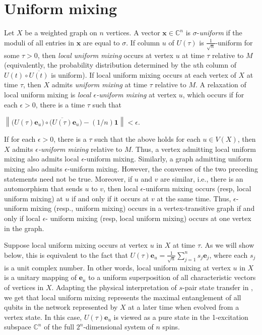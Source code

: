 \documentclass[11pt]{article}
\newcommand{\be}{\mathbf e}
\newcommand{\bx}{\mathbf x}
\newcommand{\one}{\mathbf 1}
\def\C{\mathbb{C}}
\begin{document}
\section{Uniform mixing}\label{sec:UM} 

Let $X$ be a weighted graph on $n$ vertices. A vector $\bx\in\C^n$ is $\sigma$-\textit{uniform} if the moduli of all entries in $\bx$ are equal to $\sigma$. 
If column $u$ of $U(\tau)$ is $\frac{1}{\sqrt{n}}$-uniform for some $\tau>0$, then \textit{local uniform mixing} occurs at vertex $u$ at time $\tau$ relative to $M$ (equivalently, the probability distribution determined by the $u$th column of $U(t)\circ\overline{U(t)}$ is uniform). If local uniform mixing occurs at each vertex of $X$ at time $\tau$, then $X$ admits \textit{uniform mixing} at time $\tau$ relative to $M$. A relaxation of local uniform mixing is \textit{local  $\epsilon$-uniform mixing} at vertex $u$, which occurs if for each $\epsilon>0$, there is a time $\tau$ such that 
\begin{center}
$\left\|\big(U(\tau)\be_u\big)\circ\big(\overline{U(\tau)}\be_u\big)-(1/n)\one\right\|<\epsilon.$
\end{center}
If for each $\epsilon>0$, there is a $\tau$ such that the above holds for each $u\in V(X)$, then $X$ admits \textit{$\epsilon$-uniform mixing}  relative to $M$. Thus, a vertex admitting local uniform mixing also admits local $\epsilon$-uniform mixing. Similarly, a graph admitting uniform mixing also admits $\epsilon$-uniform mixing. However, the converses of the two preceding statements need not be true. Moreover, if $u$ and $v$ are similar, i.e., there is an automorphism that sends $u$ to $v$, then  local $\epsilon$-uniform mixing occurs (resp, local uniform mixing) at $u$ if and only if it occurs at $v$ at the same time. Thus, $\epsilon$-uniform mixing (resp., uniform mixing) occurs in a vertex-transitive graph if and only if local $\epsilon$- uniform mixing (resp, local uniform mixing) occurs at one vertex in the graph.

Suppose local uniform mixing occurs at vertex $u$ in $X$ at time $\tau$. As we will show below, this is equivalent to the fact that $U(\tau)\be_u=\frac{1}{\sqrt{n}}\sum_{j=1}^{n}s_j\be_j$, where each $s_j$ is a unit complex number. In other words, local uniform mixing at vertex $u$ in $X$ is a unitary mapping of $\be_u$ to a uniform superposition of all characteristic vectors of vertices in $X$. Adapting the physical interpretation of $s$-pair state transfer in \cite{kim2024generalization}, we get that local uniform mixing represents the maximal entanglement of all qubits in the network represented by $X$ at a later time when evolved from a vertex state. In this case,  $U(\tau)\be_u$ is viewed as a pure state in the 1-excitation subspace $\mathbb{C}^n$ of the full $2^n$-dimensional system of $n$ spins. 
\end{document}
